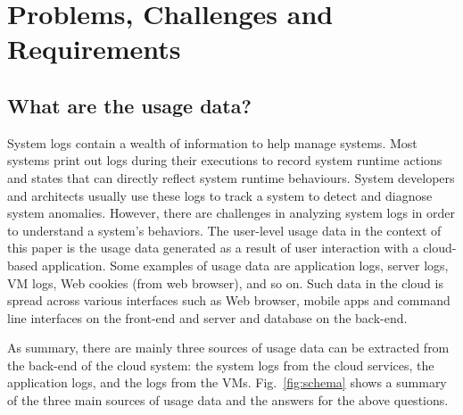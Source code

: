 \section{Problems, Challenges and Requirements}

\subsection{What are the usage data?}

System logs contain a wealth of information to help manage systems. Most systems print out  logs during their executions to record system runtime actions and states that can directly reflect system runtime behaviours. System developers and architects usually use these logs to track a system to detect and diagnose system anomalies. However, there are challenges in analyzing system logs in order to understand a system’s behaviors. 
The user-level usage data in the context of this paper is the usage data generated as a result of user interaction with a cloud-based application. Some examples of usage data are  application logs, server logs, VM logs, Web cookies (from web browser), and so on. Such data in the cloud is spread across various interfaces such as Web browser, mobile apps and command line interfaces on the front-end and server and database on the back-end.  

As summary, there are mainly three sources of usage data can be extracted from the back-end of the cloud system: the system logs from the cloud services, the application logs, and the logs from the VMs. Fig.~\ref{fig:schema} shows a summary of the three main sources of usage data and the answers for the above questions.


